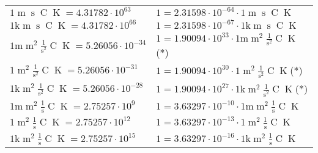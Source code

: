 \begin{center}
\begin{longtable}{l l}
{\color{black}$1 \bm{\mathrm{ }}{\operatorname{m}}{\operatorname{s}}{\operatorname{C}}{\operatorname{K}} = 4.31782\cdot10^{63} $}   & {\color{black}$ 1 = 2.31598\cdot10^{-64} \cdot 1 \bm{\mathrm{ }}{\operatorname{m}}{\operatorname{s}}{\operatorname{C}}{\operatorname{K}}$}  \\
{\color{gray}$1 \bm{\mathrm{ k}}{\operatorname{m}}{\operatorname{s}}{\operatorname{C}}{\operatorname{K}} = 4.31782\cdot10^{66} $}   & {\color{gray}$ 1 = 2.31598\cdot10^{-67} \cdot 1 \bm{\mathrm{ k}}{\operatorname{m}}{\operatorname{s}}{\operatorname{C}}{\operatorname{K}}$}  \\
{\color{gray}$1 \bm{\mathrm{ m}}{\operatorname{m}^2}\frac1{\operatorname{s}^2}{\operatorname{C}}{\operatorname{K}} = 5.26056\cdot10^{-34} $}   & {\color{gray}$ 1 = 1.90094\cdot10^{33} \cdot 1 \bm{\mathrm{ m}}{\operatorname{m}^2}\frac1{\operatorname{s}^2}{\operatorname{C}}{\operatorname{K}}$}\quad(*)\\
{\color{black}$1 \bm{\mathrm{ }}{\operatorname{m}^2}\frac1{\operatorname{s}^2}{\operatorname{C}}{\operatorname{K}} = 5.26056\cdot10^{-31} $}   & {\color{black}$ 1 = 1.90094\cdot10^{30} \cdot 1 \bm{\mathrm{ }}{\operatorname{m}^2}\frac1{\operatorname{s}^2}{\operatorname{C}}{\operatorname{K}}$}\quad(*)\\
{\color{gray}$1 \bm{\mathrm{ k}}{\operatorname{m}^2}\frac1{\operatorname{s}^2}{\operatorname{C}}{\operatorname{K}} = 5.26056\cdot10^{-28} $}   & {\color{gray}$ 1 = 1.90094\cdot10^{27} \cdot 1 \bm{\mathrm{ k}}{\operatorname{m}^2}\frac1{\operatorname{s}^2}{\operatorname{C}}{\operatorname{K}}$}\quad(*)\\
{\color{gray}$1 \bm{\mathrm{ m}}{\operatorname{m}^2}\frac1{\operatorname{s}}{\operatorname{C}}{\operatorname{K}} = 2.75257\cdot10^{9} $}   & {\color{gray}$ 1 = 3.63297\cdot10^{-10} \cdot 1 \bm{\mathrm{ m}}{\operatorname{m}^2}\frac1{\operatorname{s}}{\operatorname{C}}{\operatorname{K}}$}  \\
{\color{black}$1 \bm{\mathrm{ }}{\operatorname{m}^2}\frac1{\operatorname{s}}{\operatorname{C}}{\operatorname{K}} = 2.75257\cdot10^{12} $}   & {\color{black}$ 1 = 3.63297\cdot10^{-13} \cdot 1 \bm{\mathrm{ }}{\operatorname{m}^2}\frac1{\operatorname{s}}{\operatorname{C}}{\operatorname{K}}$}  \\
{\color{gray}$1 \bm{\mathrm{ k}}{\operatorname{m}^2}\frac1{\operatorname{s}}{\operatorname{C}}{\operatorname{K}} = 2.75257\cdot10^{15} $}   & {\color{gray}$ 1 = 3.63297\cdot10^{-16} \cdot 1 \bm{\mathrm{ k}}{\operatorname{m}^2}\frac1{\operatorname{s}}{\operatorname{C}}{\operatorname{K}}$}  \\

\end{longtable}
\end{center}
